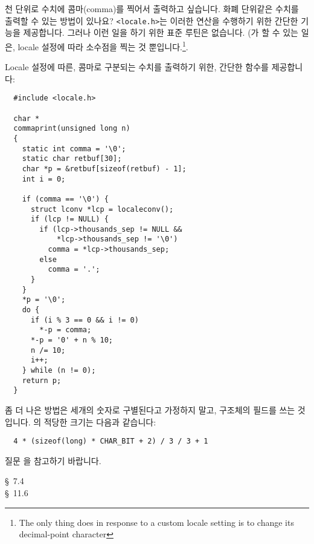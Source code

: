 \begin{faq}
	천 단위로 수치에 콤마(comma)를 찍어서 출력하고 싶습니다.  화폐 단위같은
	수치를 출력할 수 있는 방법이 있나요?
\A
	\verb+<locale.h>+는 이러한 연산을 수행하기 위한 간단한 기능을
	제공합니다.  그러나 이런 일을 하기 위한 표준 루틴은 없습니다.
	(가 할 수 있는 일은, locale 설정에 따라 소수점을 찍는 것
        뿐입니다.\footnote{
	The only thing  does in response to a
	custom locale setting is to change its decimal-point character}.

	Locale 설정에 따른, 콤마로 구분되는 수치를 출력하기 위한, 간단한
	함수를 제공합니다:

\begin{verbatim}
  #include <locale.h>

  char *
  commaprint(unsigned long n)
  {
    static int comma = '\0';
    static char retbuf[30];
    char *p = &retbuf[sizeof(retbuf) - 1];
    int i = 0;

    if (comma == '\0') {
      struct lconv *lcp = localeconv();
      if (lcp != NULL) {
        if (lcp->thousands_sep != NULL &&
            *lcp->thousands_sep != '\0')
          comma = *lcp->thousands_sep;
        else
          comma = '.';
      }
    }
    *p = '\0';
    do {
      if (i % 3 == 0 && i != 0)
        *-p = comma;
      *-p = '0' + n % 10;
      n /= 10;
      i++;
    } while (n != 0);
    return p;
  }
\end{verbatim}

	좀 더 나은 방법은 세개의 숫자로 구별된다고 가정하지 말고,
	 구조체의  필드를 쓰는 것입니다.
	의 적당한 크기는 다음과 같습니다:
\begin{verbatim}
  4 * (sizeof(long) * CHAR_BIT + 2) / 3 / 3 + 1
\end{verbatim}
	질문 을 참고하기 바랍니다.

\R
	\cite{c89} \S\ 7.4 \\
	\cite{hs} \S\ 11.6 
\end{faq}


